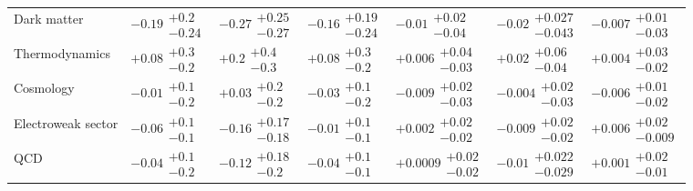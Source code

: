 \begin{table}[H]
\begin{tabular}{lllllll}
Dark matter                               &          $-0.19\substack{+0.2 \\ -0.24}$ &    $\bm{-0.27}\substack{+0.25 \\ -0.27}$ &         $-0.16\substack{+0.19 \\ -0.24}$ &         $-0.01\substack{+0.02 \\ -0.04}$ &       $-0.02\substack{+0.027 \\ -0.043}$ &        $-0.007\substack{+0.01 \\ -0.03}$ \\
Thermodynamics                            &           $+0.08\substack{+0.3 \\ -0.2}$ &            $+0.2\substack{+0.4 \\ -0.3}$ &           $+0.08\substack{+0.3 \\ -0.2}$ &        $+0.006\substack{+0.04 \\ -0.03}$ &         $+0.02\substack{+0.06 \\ -0.04}$ &        $+0.004\substack{+0.03 \\ -0.02}$ \\
Cosmology                                 &           $-0.01\substack{+0.1 \\ -0.2}$ &           $+0.03\substack{+0.2 \\ -0.2}$ &           $-0.03\substack{+0.1 \\ -0.2}$ &        $-0.009\substack{+0.02 \\ -0.03}$ &        $-0.004\substack{+0.02 \\ -0.03}$ &        $-0.006\substack{+0.01 \\ -0.02}$ \\
Electroweak sector                        &           $-0.06\substack{+0.1 \\ -0.1}$ &         $-0.16\substack{+0.17 \\ -0.18}$ &           $-0.01\substack{+0.1 \\ -0.1}$ &        $+0.002\substack{+0.02 \\ -0.02}$ &        $-0.009\substack{+0.02 \\ -0.02}$ &       $+0.006\substack{+0.02 \\ -0.009}$ \\
QCD                                       &           $-0.04\substack{+0.1 \\ -0.2}$ &          $-0.12\substack{+0.18 \\ -0.2}$ &           $-0.04\substack{+0.1 \\ -0.1}$ &       $+0.0009\substack{+0.02 \\ -0.02}$ &       $-0.01\substack{+0.022 \\ -0.029}$ &        $+0.001\substack{+0.02 \\ -0.01}$ \\

\end{tabular}
\end{table}
